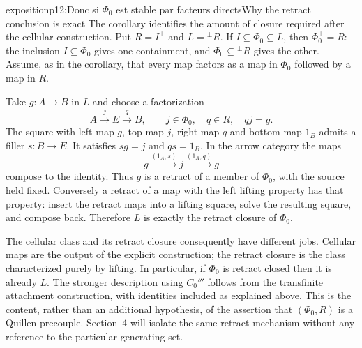 \begin{dcomment}{exposition}{p12:Donc si $\Phi_0$ est stable par facteurs directs}{Why the retract conclusion is exact}
The corollary identifies the amount of closure required after the cellular construction. Put $R=I^\perp$ and $L={}^{\perp}R$. If $I\subseteq\Phi_0\subseteq L$, then $\Phi_0^\perp=R$: the inclusion $I\subseteq\Phi_0$ gives one containment, and $\Phi_0\subseteq{}^{\perp}R$ gives the other. Assume, as in the corollary, that every map factors as a map in $\Phi_0$ followed by a map in $R$.

Take $g:A\to B$ in $L$ and choose a factorization
\[
 A\xrightarrow{j}E\xrightarrow{q}B,
 \qquad j\in\Phi_0,\quad q\in R,\quad qj=g.
\]
The square with left map $g$, top map $j$, right map $q$ and bottom map $1_B$ admits a filler $s:B\to E$. It satisfies $sg=j$ and $qs=1_B$. In the arrow category the maps
\[
 g\xrightarrow{(1_A,s)}j\xrightarrow{(1_A,q)}g
\]
compose to the identity. Thus $g$ is a retract of a member of $\Phi_0$, with the source held fixed. Conversely a retract of a map with the left lifting property has that property: insert the retract maps into a lifting square, solve the resulting square, and compose back. Therefore $L$ is exactly the retract closure of $\Phi_0$.

The cellular class and its retract closure consequently have different jobs. Cellular maps are the output of the explicit construction; the retract closure is the class characterized purely by lifting. In particular, if $\Phi_0$ is retract closed then it is already $L$. The stronger description using $C_0'''$ follows from the transfinite attachment construction, with identities included as explained above. This is the content, rather than an additional hypothesis, of the assertion that $(\Phi_0,R)$ is a Quillen precouple. Section~4 will isolate the same retract mechanism without any reference to the particular generating set.
\end{dcomment}

